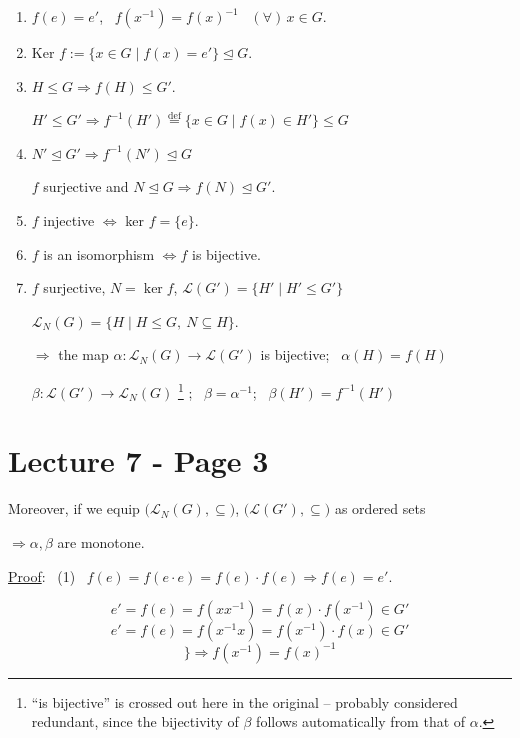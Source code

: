 \begin{enumerate}
\item[(1)] $f(e)=e'$, \ $f(x^{-1})=f(x)^{-1}$ \ $(\forall)\,x\in G$.
\item[(2).] Ker $f := \{x\in G \mid f(x)=e'\} \trianglelefteq G$.
\item[(3)] $H\leq G \Rightarrow f(H)\leq G'$.

\noindent $H'\leq G' \Rightarrow f^{-1}(H') \overset{\text{def}}{=} \{x\in G \mid f(x)\in H'\} \leq G$
\item[(4).] $N'\trianglelefteq G' \Rightarrow f^{-1}(N')\trianglelefteq G$

\noindent $f$ surjective and $N\trianglelefteq G \Rightarrow f(N)\trianglelefteq G'$.
\item[(5).] $f$ injective $\Leftrightarrow$ ker $f=\{e\}$.
\item[(6).] $f$ is an isomorphism $\Leftrightarrow f$ is bijective.
\item[(7)] $f$ surjective, $N=\ker f$, $\mathcal{L}(G')=\{H' \mid H'\leq G'\}$

\noindent $\mathcal{L}_N(G) = \{H \mid H\leq G,\ N\subseteq H\}$.

\noindent $\Rightarrow$ the map $\alpha:\mathcal{L}_N(G) \to \mathcal{L}(G')$ is bijective; \ $\alpha(H)=f(H)$

\noindent $\beta: \mathcal{L}(G') \to \mathcal{L}_N(G)$ \footnote{``is bijective'' is crossed out here in the original -- probably considered redundant, since the bijectivity of $\beta$ follows automatically from that of $\alpha$.} ; \ $\beta=\alpha^{-1}$; \ $\beta(H')=f^{-1}(H')$
\end{enumerate}




\section*{Lecture 7 - Page 3}


\noindent Moreover, if we equip $\big(\mathcal{L}_N(G),\subseteq\big)$, $\big(\mathcal{L}(G'),\subseteq\big)$ as ordered sets

\noindent $\Rightarrow \alpha,\beta$ are monotone.

\bigskip
\noindent\underline{Proof}: \ (1) \ $f(e) = f(e\cdot e) = f(e)\cdot f(e) \Rightarrow f(e)=e'$.

\[
e' = f(e) = f(xx^{-1}) = f(x)\cdot f(x^{-1}) \in G'
\]
\[
e' = f(e) = f(x^{-1}x) = f(x^{-1})\cdot f(x) \in G'
\]
\[
\Big\} \Rightarrow f(x^{-1}) = f(x)^{-1}
\]

